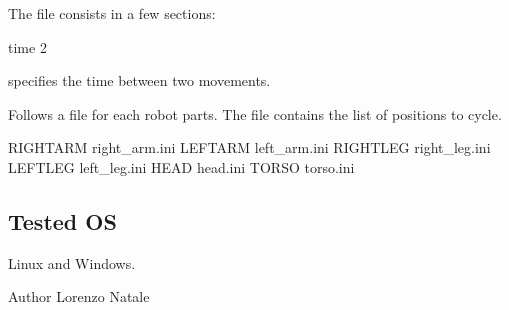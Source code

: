 The file consists in a few sections\+: 
\begin{DoxyCode}
time 2
\end{DoxyCode}
 specifies the time between two movements.

Follows a file for each robot parts. The file contains the list of positions to cycle. 
\begin{DoxyCode}
RIGHTARM right\_arm.ini
LEFTARM left\_arm.ini
RIGHTLEG right\_leg.ini
LEFTLEG left\_leg.ini
HEAD head.ini
TORSO torso.ini
\end{DoxyCode}
\hypertarget{group__src__demoYoga_tested_os_sec}{}\subsection{Tested OS}\label{group__src__demoYoga_tested_os_sec}
Linux and Windows.

\begin{DoxyAuthor}{Author}
Lorenzo Natale 
\end{DoxyAuthor}
